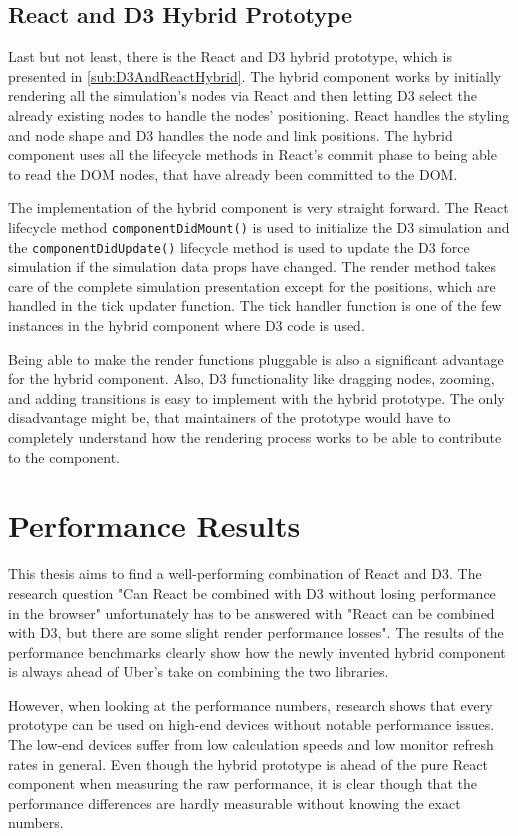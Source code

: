 \subsection{React and D3 Hybrid Prototype}

Last but not least, there is the React and D3 hybrid prototype, which is presented in \ref{sub:D3AndReactHybrid}. The hybrid component works by initially rendering all the simulation's nodes via React and then letting D3 select the already existing nodes to handle the nodes' positioning. React handles the styling and node shape and D3 handles the node and link positions. The hybrid component uses all the lifecycle methods in React's commit phase to being able to read the DOM nodes, that have already been committed to the DOM. 

The implementation of the hybrid component is very straight forward. The React lifecycle method \texttt{componentDidMount()} is used to initialize the D3 simulation and the \texttt{componentDidUpdate()} lifecycle method is used to update the D3 force simulation if the simulation data props have changed. The render method takes care of the complete simulation presentation except for the positions, which are handled in the tick updater function. The tick handler function is one of the few instances in the hybrid component where D3 code is used.

Being able to make the render functions pluggable is also a significant advantage for the hybrid component. Also, D3 functionality like dragging nodes, zooming, and adding transitions is easy to implement with the hybrid prototype. The only disadvantage might be, that maintainers of the prototype would have to completely understand how the rendering process works to be able to contribute to the component.

\section{Performance Results}

This thesis aims to find a well-performing combination of React and D3. The research question "Can React be combined with D3 without losing performance in the browser" unfortunately has to be answered with "React can be combined with D3, but there are some slight render performance losses". The results of the performance benchmarks clearly show how the newly invented hybrid component is always ahead of Uber's take on combining the two libraries. 

However, when looking at the performance numbers, research shows that every prototype can be used on high-end devices without notable performance issues. The low-end devices suffer from low calculation speeds and low monitor refresh rates in general. Even though the hybrid prototype is ahead of the pure React component when measuring the raw performance, it is clear though that the performance differences are hardly measurable without knowing the exact numbers.

